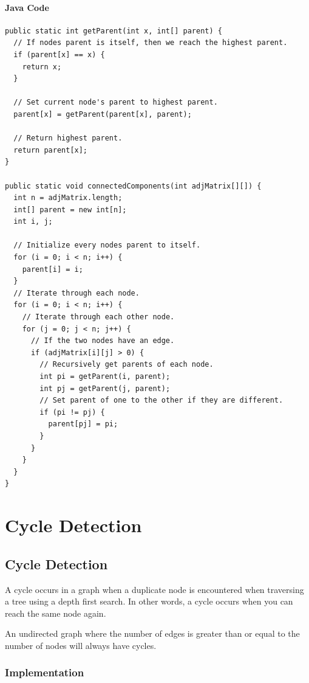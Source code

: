 \documentclass[11pt,oneside]{book}
\begin{document}
\subsubsection{Java Code}

\begin{lstlisting}
public static int getParent(int x, int[] parent) {
  // If nodes parent is itself, then we reach the highest parent.
  if (parent[x] == x) {
    return x;
  }

  // Set current node's parent to highest parent.
  parent[x] = getParent(parent[x], parent);

  // Return highest parent.
  return parent[x];
}

public static void connectedComponents(int adjMatrix[][]) {
  int n = adjMatrix.length;
  int[] parent = new int[n];
  int i, j;

  // Initialize every nodes parent to itself.
  for (i = 0; i < n; i++) {
    parent[i] = i;
  }
  // Iterate through each node.
  for (i = 0; i < n; i++) {
    // Iterate through each other node.
    for (j = 0; j < n; j++) {
      // If the two nodes have an edge.
      if (adjMatrix[i][j] > 0) {
        // Recursively get parents of each node.
        int pi = getParent(i, parent);
        int pj = getParent(j, parent);
        // Set parent of one to the other if they are different.
        if (pi != pj) {
          parent[pj] = pi;
        }
      }
    }
  }
}
\end{lstlisting}

    \chapter{ Cycle Detection }
        \section{ Cycle Detection }
        

A cycle occurs in a graph when a duplicate node is encountered when traversing a tree using a depth first search. In other words, a cycle occurs when you can reach the same node again.

An undirected graph where the number of edges is greater than or equal to the number of nodes will always have cycles.

\subsection{Implementation}
\end{document}
